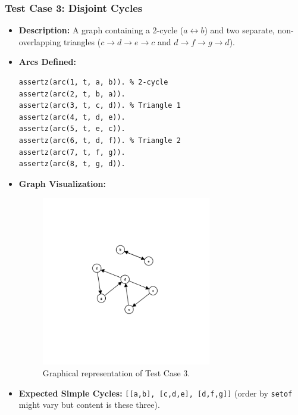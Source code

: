 \documentclass[12pt,a4paper]{article}
\begin{document}
\subsubsection{Test Case 3: Disjoint Cycles}
\begin{itemize}
\item \textbf{Description:} A graph containing a 2-cycle ($a \leftrightarrow b$) and two separate, non-overlapping triangles ($c \rightarrow d \rightarrow e \rightarrow c$ and $d \rightarrow f \rightarrow g \rightarrow d$). 
\item \textbf{Arcs Defined:}
\begin{lstlisting}[style=prologstyle, basicstyle=\ttfamily\footnotesize]
assertz(arc(1, t, a, b)). % 2-cycle
assertz(arc(2, t, b, a)).
assertz(arc(3, t, c, d)). % Triangle 1
assertz(arc(4, t, d, e)).
assertz(arc(5, t, e, c)).
assertz(arc(6, t, d, f)). % Triangle 2
assertz(arc(7, t, f, g)).
assertz(arc(8, t, g, d)).
\end{lstlisting}
\item \textbf{Graph Visualization:}
\begin{figure}[H]
\centering
\includegraphics[width=0.7\textwidth]{Test3.png} %
\caption{Graphical representation of Test Case 3.}
\label{fig:testcase3}
\end{figure}
\item \textbf{Expected Simple Cycles:} \texttt{[[a,b], [c,d,e], [d,f,g]]} (order by \texttt{setof} might vary but content is these three).
\end{itemize}
\end{document}
